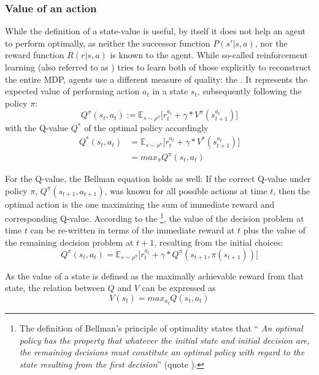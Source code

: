 \subsubsection{Value of an action}
While the definition of a state-value is useful, by itself it does not help an agent to perform optimally, as neither the successor function $P(s'|s,a)$, nor the reward function $R(r|s,a)$ is known to the agent. While so-called  reinforcement learning (also referred to as ) tries to learn both of those explicitly to reconstruct the entire MDP,  agents use a different measure of quality: the . It represents the expected value of performing action $a_t$ in a state $s_t$, subsequently following the policy $\pi$:
\begin{equation} \label{eq:1.2}
	Q^\pi(s_t,a_t) :=  \mathds{E}_{s\sim\rho^\pi} \big[ r_t^{a_t} + \gamma * V^\pi(s_{t+1}^{a_t}) \big]
\end{equation}
with the Q-value $Q^*$ of the optimal policy accordingly 
\begin{align*}
	Q^*(s_t,a_t) &=  \mathds{E}_{s\sim\rho^\pi} \big[ r_t^{a_t} + \gamma * V^*(s_{t+1}^{a_t}) \big] \\
	&= max_\pi Q^\pi(s_t,a_t)
\end{align*}

For the Q-value, the Bellman equation holds as well: If the correct Q-value under policy $\pi$, $Q^\pi(s_{t+1},a_{t+1})$, was known for all possible actions at time $t$, then the optimal action is the one maximizing the sum of immediate reward and corresponding Q-value. According to the \footnote{The definition of Bellman's principle of optimality states that ``\kern-2pt \textit{An optimal policy has the property that whatever the initial state and initial decision are, the remaining decisions must constitute an optimal policy with regard to the state resulting from the first decision}''  (quote \cite{bellman_dynamic_nodate}).}, the value of the decision problem at time $t$ can be re-written in terms of the immediate reward at $t$ plus the value of the remaining decision problem at $t+1$, resulting from the initial choices:
\begin{equation} \label{bellman}
	Q^\pi(s_t,a_t) =  \mathds{E}_{s\sim\rho^\pi} \big[r_t^{a_t} + \gamma *  Q^\pi(s_{t+1},\pi(s_{t+1}))  \big]
\end{equation}

As the value of a state is defined as the maximally achievable reward from that state, the relation between $Q$ and $V$ can be expressed as
\begin{equation} \label{eq:QandV}
V(s_t) = max_{a_t} Q(s_t, a_t)
\end{equation}

